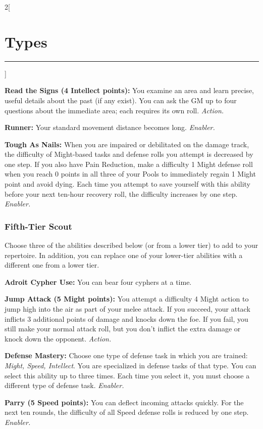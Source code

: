 \documentclass[a4paper,10pt,final]{book}
\newcommand{\HRule}{\rule{\linewidth}{0.5mm}} %
\newcommand{\newSection}[1]{\section*{#1} \addcontentsline{toc}{section}{#1} \label{sec:#1} \HRule}
\newcommand{\itemAbility}[2]{\textcolor{25gray}{\textbullet\textbf{ #1:}} {#2}\par}
\newcommand{\enabler}{\textit{ Enabler.}}
\newcommand{\action}{\textit{ Action.}}
\newenvironment{docsection}[1]
{
  \begin{multicols*}{2}[\newSection{#1}]
}
{
  \end{multicols*}
  \newpage
}
\begin{document}
\begin{docsection}{Types}
\itemAbility{Read the Signs (4 Intellect points)}{You examine an area and learn precise, useful details about the past (if any exist). You can ask the GM up to four questions about the immediate area; each requires its own roll.\action}

\itemAbility{Runner}{Your standard movement distance becomes long.\enabler}

\itemAbility{Tough As Nails}{When you are impaired or debilitated on the damage track, the difficulty of Might-based tasks and defense rolls you attempt is decreased by one step. If you also have Pain Reduction, make a difficulty 1 Might defense roll when you reach 0 points in all three of your Pools to immediately regain 1 Might point and avoid dying. Each time you attempt to save yourself with this ability before your next ten-hour recovery roll, the difficulty increases by one step.\enabler}


\subsubsection*{Fifth-Tier Scout}
\label{subsub:scoutFifthTier}

Choose three of the abilities described below (or from a lower tier) to add to your repertoire. In addition, you can replace one of your lower-tier abilities with a different one from a lower tier.

\itemAbility{Adroit Cypher Use}{You can bear four cyphers at a time.}

\itemAbility{Jump Attack (5 Might points)}{You attempt a difficulty 4 Might action to jump high into the air as part of your melee attack. If you succeed, your attack inflicts 3 additional points of damage and knocks down the foe. If you fail, you still make your normal attack roll, but you don’t inflict the extra damage or knock down the opponent.\action}

\itemAbility{Defense Mastery}{Choose one type of defense task in which you are trained: \textit{Might, Speed, Intellect}. You are specialized in defense tasks of that type. You can select this ability up to three times. Each time you select it, you must choose a different type of defense task.\enabler}

\itemAbility{Parry (5 Speed points)}{You can deflect incoming attacks quickly. For the next ten rounds, the difficulty of all Speed defense rolls is reduced by one step.\enabler}


\end{docsection}
\end{document}
